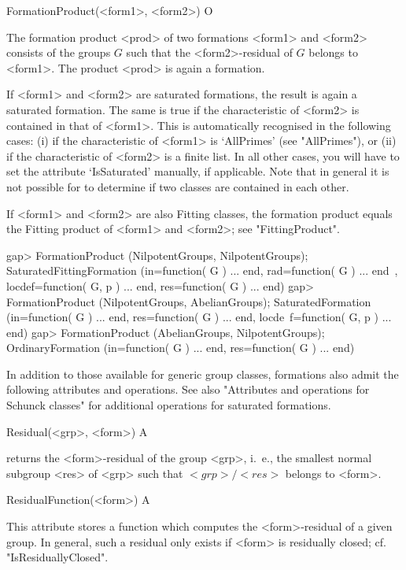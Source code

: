 \>FormationProduct(<form1>, <form2>) O

The formation product <prod> of two formations <form1> and <form2> 
consists  of the groups $G$ such that the <form2>-residual of $G$ belongs to
<form1>. The product <prod> is again a formation. 

If <form1> and <form2> are saturated formations, the result
is again a saturated formation. The same is true if the characteristic of
<form2> is contained in that of <form1>. This is automatically recognised in
the following cases: (i) if the characteristic of <form1> is `AllPrimes' (see
"AllPrimes"), or (ii) if the characteristic of <form2> is a finite list. In
all other cases, you will have to set the attribute `IsSaturated' manually,
if applicable. Note that in general it is not possible for {\CRISP} to
determine if two classes are contained in each other.

If <form1> and <form2>  are also  Fitting classes, the formation product
equals the Fitting product of <form1> and <form2>; see "FittingProduct".

\beginexample
gap> FormationProduct (NilpotentGroups, NilpotentGroups);
SaturatedFittingFormation (in=function( G ) ... end, rad=function( G ) ... end\
, locdef=function( G, p ) ... end, res=function( G ) ... end)
gap> FormationProduct (NilpotentGroups, AbelianGroups);
SaturatedFormation (in=function( G ) ... end, res=function( G ) ... end, locde\
f=function( G, p ) ... end)
gap> FormationProduct (AbelianGroups, NilpotentGroups);
OrdinaryFormation (in=function( G ) ... end, res=function( G ) ... end)
\endexample



In addition to those available for generic group classes, formations also
admit the following attributes and operations. See also "Attributes and
operations for Schunck classes" for additional operations for saturated
formations. 

\>Residual(<grp>, <form>) A

returns the <form>-residual of the group <grp>, i.~e., the smallest
normal subgroup <res> of <grp> such that $<grp>/<res>$ belongs to <form>.

\>ResidualFunction(<form>) A

This attribute stores a function which computes the <form>-residual of a
given group. In general, such a residual only exists if <form> is
residually closed; cf. "IsResiduallyClosed". 

